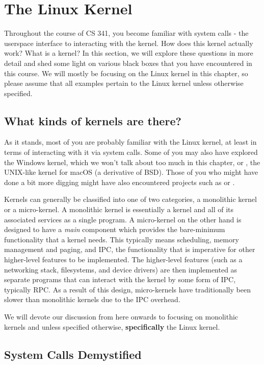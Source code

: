 \section{The Linux Kernel}

Throughout the course of CS 341, you become familiar with system calls - the userspace interface to interacting with the kernel.
How does this kernel actually work? What is a kernel?
In this section, we will explore these questions in more detail and shed some light on various black boxes that you have encountered in this course.
We will mostly be focusing on the Linux kernel in this chapter, so please assume that all examples pertain to the Linux kernel unless otherwise specified.

\subsection{What kinds of kernels are there?}

As it stands, most of you are probably familiar with the Linux kernel, at least in terms of interacting with it via system calls.
Some of you may also have explored the Windows kernel, which we won't talk about too much in this chapter,
or , the UNIX-like kernel for macOS (a derivative of BSD).
Those of you who might have done a bit more digging might have also encountered projects such as  or .

Kernels can generally be classified into one of two categories, a monolithic kernel or a micro-kernel. A monolithic
kernel is essentially a kernel and all of its associated services as a single program. A micro-kernel on the other hand
is designed to have a \textit{main} component which provides the bare-minimum functionality that a kernel needs. This
typically means scheduling, memory management and paging, and IPC, the functionality that is imperative for
other higher-level features to be implemented. The higher-level features (such as a networking stack, filesystems,
and device drivers) are then implemented as separate programs that can interact with the kernel by some
form of IPC, typically RPC. As a result of this design, micro-kernels have traditionally been slower than monolithic
kernels due to the IPC overhead.

We will devote our discussion from here onwards to focusing on monolithic kernels and unless specified otherwise,
\textbf{specifically} the Linux kernel.

\subsection{System Calls Demystified}

